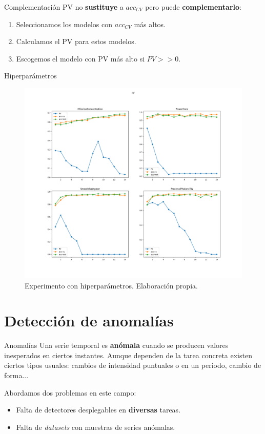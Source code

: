 \documentclass[spanish]{beamer}
\begin{document}
\begin{frame}{Complementación}
  PV no \textbf{sustituye} a $acc_{CV}$ pero puede \textbf{complementarlo}:
  \begin{enumerate}
    \item Seleccionamos los modelos con $acc_{CV}$ más altos.
    \item Calculamos el PV para estos modelos.
    \item Escogemos el modelo con PV más alto si $PV >> 0$.
  \end{enumerate}
\end{frame}

\begin{frame}{Hiperparámetros}
  \begin{figure}
    \centering
    \includegraphics[width=.78\textwidth]{img/hiper-RF}
    \caption{Experimento con hiperparámetros. Elaboración propia.}
  \end{figure}
\end{frame}

\section{Detección de anomalías}

\begin{frame}{Anomalías}
  Una serie temporal es \textbf{anómala} cuando se producen valores inesperados en ciertos instantes. \pause Aunque dependen de la tarea concreta existen ciertos tipos usuales: cambios de intensidad puntuales o en un periodo, cambio de forma...
  \pause

  Abordamos dos problemas en este campo:
  \begin{itemize}
    \item Falta de detectores desplegables en \textbf{diversas} tareas.
    \item Falta de \emph{datasets} con muestras de series anómalas.
  \end{itemize}
\end{frame}
\end{document}
